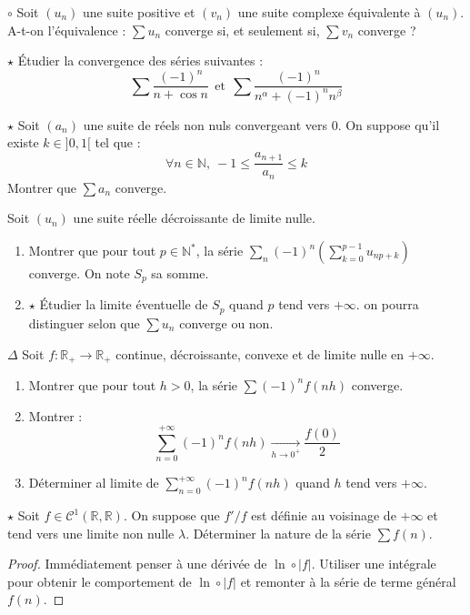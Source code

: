 \documentclass[french,a4paper]{article}
\newcommand{\N}{\mathbb{N}}
\newcommand{\R}{\mathbb{R}}
\newcommand{\st}{^*}
\theoremstyle{plain}
\theoremstyle{definition}
\theoremstyle{remark}
\begin{document}
\begin{ex}[Moulin.22]{$\circ$}
	Soit $(u_n)$ une suite positive et $(v_n)$ une suite complexe équivalente à $(u_n)$. A-t-on l'équivalence : $\displaystyle\sum u_n$ converge si, et seulement si, $\displaystyle\sum v_n$ converge ?
\end{ex}

\begin{ex}[Moulin.23]{$\star$}
	Étudier la convergence des séries suivantes :
	$$\sum\frac{(-1)^n}{n+\cos n}\ \ \text{et}\ \ \sum\frac{(-1)^n}{n^\alpha+(-1)^nn^\beta}$$
\end{ex}

\begin{ex}[Moulin.24]{$\star$}
	Soit $(a_n)$ une suite de réels non nuls convergeant vers $0$. On suppose qu'il existe $k\in]0,1[$ tel que : $$\forall n\in\N,\ -1\leqslant\frac{a_{n+1}}{a_n}\leqslant k$$ Montrer que $\sum a_n$ converge.
\end{ex}

\begin{ex}[Moulin.25]{}
	Soit $(u_n)$ une suite réelle décroissante de limite nulle.
	\begin{enumerate}
		\item Montrer que pour tout $p\in\N\st$, la série $\displaystyle\sum_n(-1)^n\left(\sum_{k=0}^{p-1}u_{np+k}\right)$ converge. On note $S_p$ sa somme.
		\item $\star$ Étudier la limite éventuelle de $S_p$ quand $p$ tend vers $+\infty$. on pourra distinguer selon que $\sum u_n$ converge ou non.
	\end{enumerate}
\end{ex}

\begin{ex}[Moulin.26]{$\Delta$}
	Soit $f:\R_+\to\R_+$ continue, décroissante, convexe et de limite nulle en $+\infty$.
	\begin{enumerate}
		\item Montrer que pour tout $h>0$, la série $\displaystyle\sum (-1)^nf(nh)$ converge.
		\item Montrer : $$\sum_{n=0}^{+\infty}(-1)^nf(nh)\xrightarrow[h\to 0^+]{}\frac{f(0)}{2}$$
		\item Déterminer al limite de $\displaystyle\sum_{n=0}^{+\infty}(-1)^nf(nh)$ quand $h$ tend vers $+\infty$.
	\end{enumerate}
\end{ex}

\begin{ex}[Moulin.27]{$\star$}
	Soit $f\in\mathcal{C}^1(\R,\R)$. On suppose que $f'/f$ est définie au voisinage de $+\infty$ et tend vers une limite non nulle $\lambda$. Déterminer la nature de la série $\sum f(n)$.
\end{ex}
\begin{proof}
	Immédiatement penser à une dérivée de $\ln\circ \lvert f\rvert$. Utiliser une intégrale pour obtenir le comportement de $\ln\circ\lvert f\rvert$ et remonter à la série de terme général $f(n)$.
\end{proof}
\end{document}
